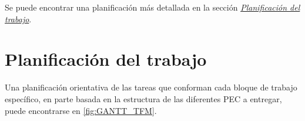 \documentclass[IB,BIB]{TFUOC}%
\begin{document}
Se puede encontrar una planificación más detallada en la sección \textit{\hyperref[sec:Planificación del trabajo]{Planificación del trabajo}}.


\newpage

\section{Planificación del trabajo}
\label{sec:Planificación del trabajo}



Una planificación orientativa de las tareas que conforman cada bloque de trabajo específico, en parte basada en la estructura de las diferentes PEC a entregar, puede encontrarse en \ref{fig:GANTT_TFM}. 

\end{document}
